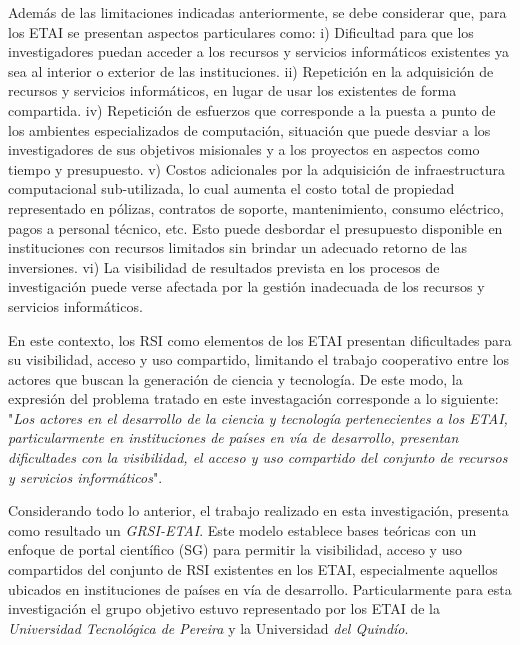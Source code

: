 Además de las limitaciones indicadas anteriormente, se debe considerar que, para los \acrshort{ETAI} se presentan aspectos particulares como: i) Dificultad para que los investigadores puedan acceder a los recursos y servicios informáticos existentes ya sea al interior o exterior de las instituciones. ii) Repetición en la adquisición de recursos y servicios informáticos, en lugar de usar los existentes de forma compartida. iv) Repetición de esfuerzos que corresponde a la puesta a punto de los ambientes especializados de computación, situación que puede desviar a los investigadores de sus objetivos misionales y a los proyectos en aspectos como tiempo y presupuesto. v) Costos adicionales por la adquisición de infraestructura computacional sub-utilizada, lo cual aumenta el costo total de propiedad representado en pólizas, contratos de soporte, mantenimiento, consumo eléctrico, pagos a personal técnico, etc. Esto puede desbordar el presupuesto disponible en instituciones con recursos limitados sin brindar un adecuado retorno de las inversiones. vi) La visibilidad de resultados prevista en los procesos de investigación puede verse afectada por la gestión inadecuada de los recursos y servicios informáticos.

En este contexto, los \acrshort{RSI} como elementos de los \acrshort{ETAI} presentan dificultades para su visibilidad, acceso y uso compartido, limitando el trabajo cooperativo entre los actores que buscan la generación de ciencia y tecnología. De este modo, la expresión del problema tratado en este investagación corresponde a lo siguiente:  "\textit{Los actores en el desarrollo de la ciencia y tecnología pertenecientes a los ETAI, particularmente en instituciones de países en vía de desarrollo, presentan dificultades con la visibilidad, el acceso y uso compartido del conjunto de recursos y servicios informáticos}".

Considerando todo lo anterior, el trabajo realizado en esta investigación, presenta como resultado un \textit{\acrfull{GRSI-ETAI}}. Este modelo establece bases teóricas con un enfoque de portal científico (\acrfull{SG}) para permitir la visibilidad, acceso y uso compartidos del conjunto de \acrshort{RSI} existentes en los \acrshort{ETAI}, especialmente aquellos ubicados en instituciones de países en vía de desarrollo. Particularmente para esta investigación el grupo objetivo estuvo representado por los \acrshort{ETAI} de la \textit{Universidad Tecnológica de Pereira} y la Universidad\textit{ del Quindío}.

